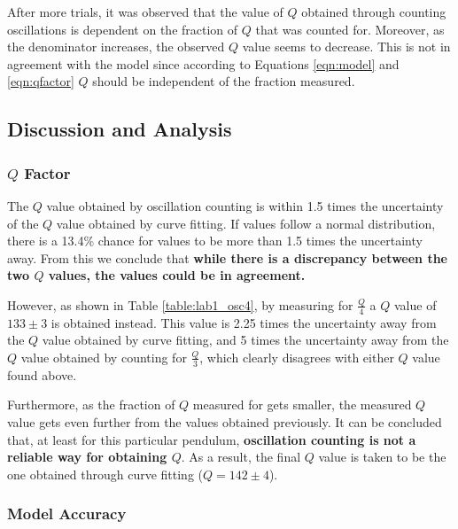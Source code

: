 \documentclass[aps,twocolumn,secnumarabic,nobalancelastpage,amsmath,amssymb,nofootinbib,floatfix,letterpaper]{revtex4}
\begin{document}
After more trials, it was observed that the value of \(Q\) obtained through counting oscillations is dependent on the
fraction of \(Q\) that was counted for. Moreover, as the denominator increases, the observed \(Q\) value seems to
decrease. This is not in agreement with the model since according to Equations \ref{eqn:model} and \ref{eqn:qfactor}
\(Q\) should be independent of the fraction measured.

\subsection{Discussion and Analysis}
\label{sec:lab1_analysis}

\subsubsection{\texorpdfstring{\(Q\)}{Q} Factor}
\label{sec:lab1_qfactor}

The \(Q\) value obtained by oscillation counting is within 1.5 times the uncertainty of the \(Q\) value obtained by
curve fitting. If values follow a normal distribution, there is a 13.4\% chance for values to be more than 1.5 times the
uncertainty away. From this we conclude that \textbf{while there is a discrepancy between the two \(Q\) values, the
values could be in agreement.}

However, as shown in Table \ref{table:lab1_osc4}, by measuring for \(\frac{Q}{4}\) a \(Q\) value of \(133 \pm 3\) is
obtained instead. This value is 2.25 times the uncertainty away from the \(Q\) value obtained by curve fitting, and 5
times the uncertainty away from the \(Q\) value obtained by counting for \(\frac{Q}{3}\), which clearly disagrees with
either \(Q\) value found above.

Furthermore, as the fraction of \(Q\) measured for gets smaller, the measured \(Q\) value gets even further from the
values obtained previously. It can be concluded that, at least for this particular pendulum, \textbf{oscillation
counting is not a reliable way for obtaining \(Q\)}. As a result, the final \(Q\) value is taken to be the one obtained
through curve fitting (\(Q = 142 \pm 4\)).

\subsubsection{Model Accuracy}
\label{sec:lab1_accuracy}
\end{document}
